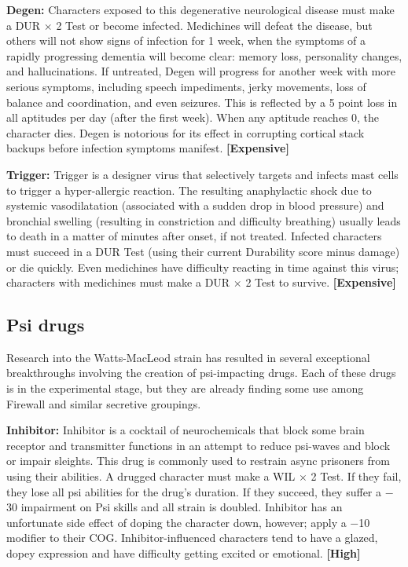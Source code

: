 \textbf{Degen:} Characters exposed to this degenerative neurological disease must make a DUR $\times$ 2 Test or become infected. Medichines will defeat the disease, but others will not show signs of infection for 1 week, when the symptoms of a rapidly progressing dementia will become clear: memory loss, personality changes, and hallucinations. If untreated, Degen will progress for another week with more serious symptoms, including speech impediments, jerky movements, loss of balance and coordination, and even seizures. This is reflected by a 5 point loss in all aptitudes per day (after the first week). When any aptitude reaches 0, the character dies. Degen is notorious for its effect in corrupting cortical stack backups before infection symptoms manifest. \textbf{[Expensive]}

\textbf{Trigger:} Trigger is a designer virus that selectively targets and infects mast cells to trigger a hyper-allergic reaction. The resulting anaphylactic shock due to systemic vasodilatation (associated with a sudden drop in blood pressure) and bronchial swelling (resulting in constriction and difficulty breathing) usually leads to death in a matter of minutes after onset, if not treated. Infected characters must succeed in a DUR Test (using their current Durability score minus damage) or die quickly. Even medichines have difficulty reacting in time against this virus; characters with medichines must make a DUR $\times$ 2 Test to survive. \textbf{[Expensive]}


\subsection{Psi drugs}
\label{sec:psi-drugs}

Research into the Watts-MacLeod strain has resulted in several exceptional breakthroughs involving the creation of psi-impacting drugs. Each of these drugs is in the experimental stage, but they are already finding some use among Firewall and similar secretive groupings.

\textbf{Inhibitor:} Inhibitor is a cocktail of neurochemicals that block some brain receptor and transmitter functions in an attempt to reduce psi-waves and block or impair sleights. This drug is commonly used to restrain async prisoners from using their abilities. A drugged character must make a WIL $\times$ 2 Test. If they fail, they lose all psi abilities for the drug’s duration. If they succeed, they suffer a $-$30 impairment on Psi skills and all strain is doubled. Inhibitor has an unfortunate side effect of doping the character down, however; apply a $-$10 modifier to their COG. Inhibitor-influenced characters tend to have a glazed, dopey expression and have difficulty getting excited or emotional. \textbf{[High]}

